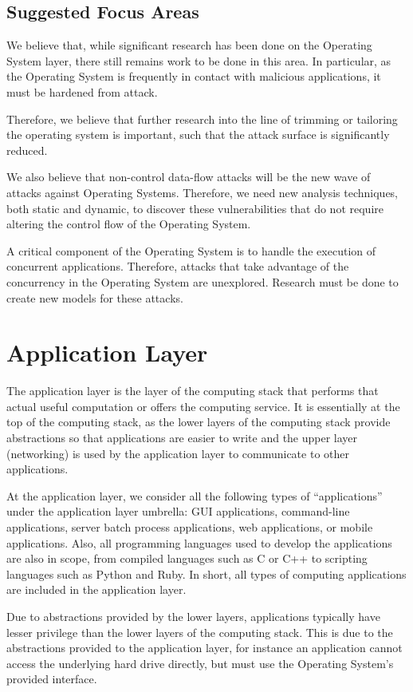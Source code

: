 \documentclass[11pt,letterpaper]{article}
\begin{document}
\subsection{Suggested Focus Areas}

We believe that, while significant research has been done on the
Operating System layer, there still remains work to be done in this
area. In particular, as the Operating System is frequently in contact
with malicious applications, it must be hardened from attack.

Therefore, we believe that further research into the line of trimming
or tailoring the operating system is important, such that the attack
surface is significantly reduced.

We also believe that non-control data-flow attacks will be the new
wave of attacks against Operating Systems. Therefore, we need new
analysis techniques, both static and dynamic, to discover these
vulnerabilities that do not require altering the control flow of the
Operating System.

A critical component of the Operating System is to handle the
execution of concurrent applications. Therefore, attacks that take
advantage of the concurrency in the Operating System are unexplored.
Research must be done to create new models for these attacks. 

\section{Application Layer}

The application layer is the layer of the computing stack that
performs that actual useful computation or offers the computing
service. It is essentially at the top of the computing stack, as the
lower layers of the computing stack provide abstractions so that
applications are easier to write and the upper layer (networking) is
used by the application layer to communicate to other applications.

At the application layer, we consider all the following types of
``applications'' under the application layer umbrella: GUI
applications, command-line applications, server batch process
applications, web applications, or mobile applications. Also, all
programming languages used to develop the applications are also in
scope, from compiled languages such as C or C++ to scripting languages
such as Python and Ruby. In short, all types of computing applications
are included in the application layer.

Due to abstractions provided by the lower layers, applications
typically have lesser privilege than the lower layers of the computing
stack. This is due to the abstractions provided to the application
layer, for instance an application cannot access the underlying hard
drive directly, but must use the Operating System's provided
interface.
\end{document}
